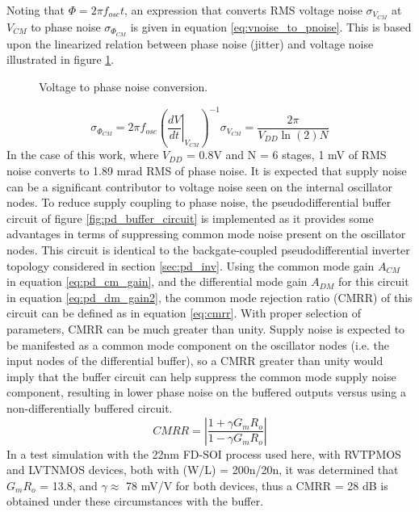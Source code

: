 		Noting that $\Phi = 2\pi f_{osc}t$, an expression that converts RMS voltage noise $\sigma_{V_{CM}}$ at $V_{CM}$ to phase noise $\sigma_{\Phi_{CM}}$ is given in equation \ref{eq:vnoise_to_pnoise}. This is based upon the linearized relation between phase noise (jitter) and voltage noise illustrated in figure \ref{fig:voltn_to_pn}.
			\begin{figure}[htb!]
			        \centering
			        
			    \caption{Voltage to phase noise conversion.}
			    \label{fig:voltn_to_pn}
			\end{figure}
			\begin{equation}\label{eq:vnoise_to_pnoise}
					\sigma_{\Phi_{CM}} = 2\pi f_{osc}\left(\left.\frac{dV}{dt}\right|_{V_{CM}}\right)^{-1}\sigma_{V_{CM}} = \frac{2\pi}{V_{DD}\ln(2)N} 
			\end{equation}
		In the case of this work, where $V_{DD}$ = 0.8V and N = 6 stages, 1 mV of RMS noise converts to 1.89 mrad RMS of phase noise. It is expected that supply noise can be a significant contributor to voltage noise seen on the internal oscillator nodes. To reduce supply coupling to phase noise, the pseudodifferential buffer circuit of figure \ref{fig:pd_buffer_circuit} is implemented as it provides some advantages in terms of suppressing common mode noise present on the oscillator nodes. This circuit is identical to the backgate-coupled pseudodifferential inverter topology considered in section \ref{sec:pd_inv}. Using the common mode gain $A_{CM}$ in equation \ref{eq:pd_cm_gain}, and the differential mode gain $A_{DM}$ for this circuit in equation \ref{eq:pd_dm_gain2}, the common mode rejection ratio (CMRR) of this circuit can be defined as in equation \ref{eq:cmrr}. With proper selection of parameters, CMRR can be much greater than unity. Supply noise is expected to be manifested as a common mode component on the oscillator nodes (i.e. the input nodes of the differential buffer), so a CMRR greater than unity would imply that the buffer circuit can help suppress the common mode supply noise component, resulting in lower phase noise on the buffered outputs versus using a non-differentially buffered circuit.
				\begin{equation}\label{eq:cmrr}
					CMRR = \left|\frac{1+\gamma G_m R_o}{1-\gamma G_m R_o}\right|
				\end{equation}
		In a test simulation with the 22nm FD-SOI process used here, with RVTPMOS and LVTNMOS devices, both with (W/L) = 200n/20n, it was determined that $G_m R_o$ = 13.8, and $\gamma\approx$ 78 mV/V for both devices, thus a CMRR = 28 dB is obtained under these circumstances with the buffer. 

